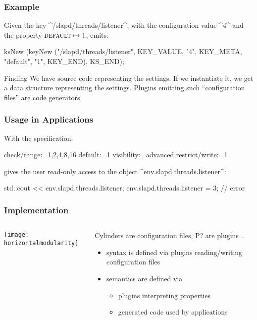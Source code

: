 \begin{frame}[fragile]
	\frametitle{Example}
	\begin{example}
	Given the key ^/slapd/threads/listener^, with the configuration value ^4^ and the property ${\textsc{default}} \mapsto 1$, \elektra{} emits:

	\begin{code}[gobble=4,language=Cpp]
	ksNew (keyNew ("/slapd/threads/listener",
		       KEY_VALUE, "4",
		       KEY_META, "default", "1",
		       KEY_END),
	       KS_END);
	\end{code}
	\vspace{-1em}
	\end{example}

	\pause
	\begin{alertblock}{Finding}
	We have source code representing the settings.
	If we instantiate it, we get a data structure representing the settings.
	Plugins emitting such ``configuration files'' are code generators.
	\end{alertblock}
\end{frame}

\begin{frame}[fragile]
	\frametitle{Usage in Applications}

	With the specification:
	\par
	\begin{code}
	  check/range:=1,2,4,8,16
	  default:=1
	  visibility:=advanced
	  restrict/write:=1
	\end{code}
	\par
	 gives the user read-only access to the object ^env.slapd.threads.listener^:
	\par
	\begin{code}[language=Cpp]
	std::cout << env.slapd.threads.listener;
	env.slapd.threads.listener = 3; // error
	\end{code}
	\par
\end{frame}

\begin{frame}
	\frametitle{Implementation}
	\begin{columns}[c]
	\begin{column}{6cm}
	\texttt{[image: horizontalmodularity]}
	\end{column}
	\begin{column}{5cm}
	Cylinders are configuration files, P? are plugins~\cite{raab2016improving}.

	\begin{itemize}
	\item syntax is defined via plugins reading/writing configuration files
	\item semantics are defined via
		\begin{itemize}
		\item plugins interpreting properties
		\item generated code used by applications
		\end{itemize}
	\end{itemize}
	\end{column}
	\end{columns}
\end{frame}

